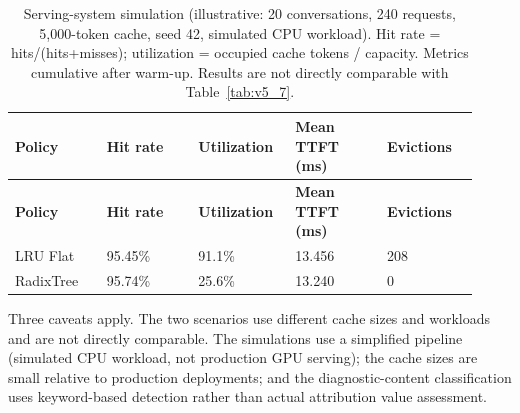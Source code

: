 \documentclass[preprint,12pt]{elsarticle}
\begin{document}
\begin{center}
\begingroup
\setlength{\tabcolsep}{2pt}
\renewcommand{\arraystretch}{1.16}
\footnotesize
\begin{longtable}{|p{0.183\linewidth}|p{0.183\linewidth}|p{0.183\linewidth}|p{0.183\linewidth}|p{0.183\linewidth}|}
\caption{Serving-system simulation (illustrative: 20 conversations, 240 requests, 5,000-token cache, seed 42, simulated CPU workload). Hit rate = hits/(hits+misses); utilization = occupied cache tokens / capacity. Metrics cumulative after warm-up. Results are not directly comparable with Table~\ref{tab:v5_7}.}\label{tab:v5_8}\\
\hline
\textbf{Policy} & \textbf{Hit rate} & \textbf{Utilization} & \textbf{Mean TTFT (ms)} & \textbf{Evictions} \\ \hline
\endfirsthead
\textbf{Policy} & \textbf{Hit rate} & \textbf{Utilization} & \textbf{Mean TTFT (ms)} & \textbf{Evictions} \\ \hline
\endhead
LRU Flat & 95.45\% & 91.1\% & 13.456 & 208 \\ \hline
RadixTree & 95.74\% & 25.6\% & 13.240 & 0 \\ \hline
\end{longtable}
\endgroup
\end{center}
Three caveats apply. The two scenarios use different cache sizes and workloads and are not directly comparable. The simulations use a simplified pipeline (simulated CPU workload, not production GPU serving); the cache sizes are small relative to production deployments; and the diagnostic-content classification uses keyword-based detection rather than actual attribution value assessment.
\end{document}
